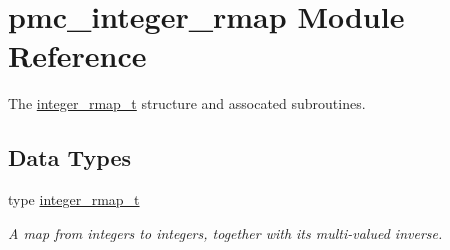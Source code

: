 \hypertarget{namespacepmc__integer__rmap}{}\section{pmc\+\_\+integer\+\_\+rmap Module Reference}
\label{namespacepmc__integer__rmap}


The \mbox{\hyperlink{structpmc__integer__rmap_1_1integer__rmap__t}{integer\+\_\+rmap\+\_\+t}} structure and assocated subroutines.  


\subsection*{Data Types}
\begin{DoxyCompactItemize}
\item 
type \mbox{\hyperlink{structpmc__integer__rmap_1_1integer__rmap__t}{integer\+\_\+rmap\+\_\+t}}
\begin{DoxyCompactList}\small\item\em A map from integers to integers, together with its multi-\/valued inverse. \end{DoxyCompactList}\end{DoxyCompactItemize}
